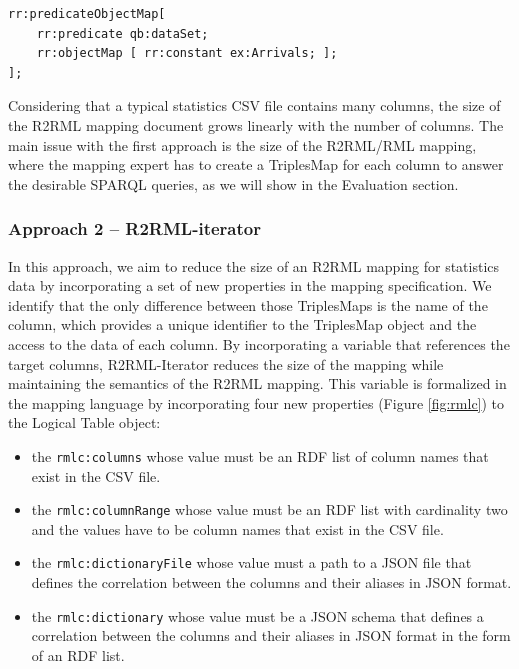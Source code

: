 \begin{lstlisting}[float,caption=Dataset mapping,frame=tlrb,label={list:dataset}, columns=fullflexible]
rr:predicateObjectMap[ 
    rr:predicate qb:dataSet; 
    rr:objectMap [ rr:constant ex:Arrivals; ];
];
\end{lstlisting}
\lstset{upquote=false}
Considering that a typical statistics CSV file contains many columns, the size of the R2RML mapping document grows linearly with the number of columns. The main issue with the first approach is the size of the R2RML/RML mapping, where the mapping expert has to create a TriplesMap for each column to answer the desirable SPARQL queries, as we will show in the Evaluation section.

\subsubsection{Approach 2 -- R2RML-iterator}
In this approach, we aim to reduce the size of an R2RML mapping for statistics data by incorporating a set of new properties in the mapping specification. We identify that the only difference between those TriplesMaps is the name of the column, which provides a unique identifier to the TriplesMap object and the access to the data of each column. By incorporating a variable that references the target columns, R2RML-Iterator reduces the size of the mapping while maintaining the semantics of the R2RML mapping. This variable is formalized in the mapping language by incorporating four new properties (Figure \ref{fig:rmlc}) to the Logical Table object:

\begin{itemize}
\item the \texttt{rmlc:columns} whose value must be an RDF list of column names that exist in the CSV file.
\item the \texttt{rmlc:columnRange} whose value must be an RDF list with cardinality two and the values have to be column names that exist in the CSV file.
\item the \texttt{rmlc:dictionaryFile} whose value must a path to a JSON file that defines the correlation between the columns and their aliases in JSON format.
\item the \texttt{rmlc:dictionary} whose value must be a JSON schema that defines a correlation between the columns and their aliases in JSON format in the form of an RDF list.
\end{itemize}

